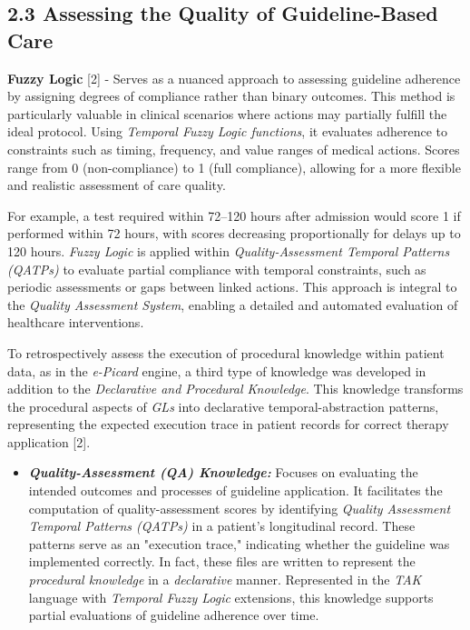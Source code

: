\documentclass[
]{article}
\begin{document}
\subsection{2.3 Assessing the Quality of Guideline-Based
Care}\label{assessing-the-quality-of-guideline-based-care}

\textbf{Fuzzy Logic} {[}2{]} - Serves as a nuanced approach to assessing
guideline adherence by assigning degrees of compliance rather than
binary outcomes. This method is particularly valuable in clinical
scenarios where actions may partially fulfill the ideal protocol. Using
\emph{Temporal Fuzzy Logic functions}, it evaluates adherence to
constraints such as timing, frequency, and value ranges of medical
actions. Scores range from 0 (non-compliance) to 1 (full compliance),
allowing for a more flexible and realistic assessment of care quality.

For example, a test required within 72--120 hours after admission would
score 1 if performed within 72 hours, with scores decreasing
proportionally for delays up to 120 hours. \emph{Fuzzy Logic} is applied
within \emph{Quality-Assessment Temporal Patterns (QATPs)} to evaluate
partial compliance with temporal constraints, such as periodic
assessments or gaps between linked actions. This approach is integral to
the \emph{Quality Assessment System}, enabling a detailed and automated
evaluation of healthcare interventions.

To retrospectively assess the execution of procedural knowledge within
patient data, as in the \emph{e-Picard} engine, a third type of
knowledge was developed in addition to the \emph{Declarative and
Procedural Knowledge}. This knowledge transforms the procedural aspects
of \emph{GLs} into declarative temporal-abstraction patterns,
representing the expected execution trace in patient records for correct
therapy application {[}2{]}.

\begin{itemize}
\item
  \emph{\textbf{Quality-Assessment (QA) Knowledge:}} Focuses on
  evaluating the intended outcomes and processes of guideline
  application. It facilitates the computation of quality-assessment
  scores by identifying \emph{Quality Assessment Temporal Patterns
  (QATPs)} in a patient's longitudinal record. These patterns serve as
  an "execution trace," indicating whether the guideline was implemented
  correctly. In fact, these files are written to represent the
  \emph{procedural knowledge} in a \emph{declarative} manner.
  Represented in the \emph{TAK} language with \emph{Temporal Fuzzy
  Logic} extensions, this knowledge supports partial evaluations of
  guideline adherence over time.
\end{itemize}
\end{document}
